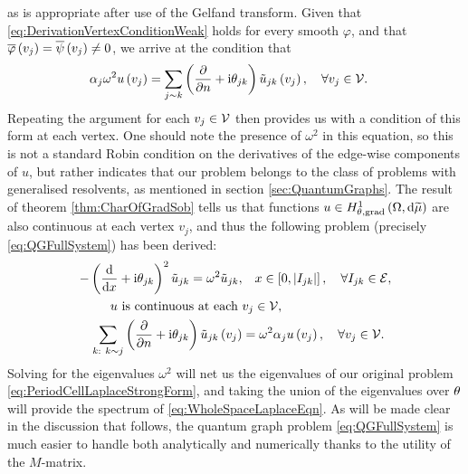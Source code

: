as is appropriate after use of the Gelfand transform.
Given that \eqref{eq:DerivationVertexConditionWeak} holds for every smooth $\varphi$, and that $\overline{\varphi}\left( v_j \right)=\overline{\psi}\left( v_j \right)\neq 0$, we arrive at the condition that
\begin{align*}
	\alpha_j\omega^2 u\left( v_j \right) &= \sum_{j\sim k}\left( \dfrac{\partial }{\partial n} + \mathrm{i}\theta_{jk} \right)\tilde{u}_{jk}\left( v_j \right), \quad \forall v_j \in \mathcal{V}.
\end{align*}
Repeating the argument for each $v_j\in \mathcal{V}$ then provides us with a condition of this form at each vertex.
One should note the presence of $\omega^2$ in this equation, so this is not a standard Robin condition on the derivatives of the edge-wise components of $u$, but rather indicates that our problem belongs to the class of problems with generalised resolvents, as mentioned in section \ref{sec:QuantumGraphs}.
The result of theorem \ref{thm:CharOfGradSob} tells us that functions $u\in H^1_{\theta, \mathrm{grad}}\left( \Omega, \mathrm{d}\widetilde{\mu} \right)$ are also continuous at each vertex $v_j$, and thus the following problem (precisely \eqref{eq:QGFullSystem}) has been derived:
\begin{align*}
	-\left( \dfrac{\mathrm{d}}{\mathrm{d}x} + \mathrm{i}\theta_{jk} \right)^2 \tilde{u}_{jk} = \omega^2 \tilde{u}_{jk}, &\quad x\in\left[ 0,\left\lvert I_{jk} \right\rvert \right], \quad \forall I_{jk}\in \mathcal{E}, \\
	u \text{ is continuous at each } &v_j \in \mathcal{V}, \\
	\sum_{k: \ k\sim j}\left( \dfrac{\partial }{\partial n} + \mathrm{i}\theta_{jk} \right)\tilde{u}_{jk}\left( v_j \right) &= \omega^2\alpha_{j}u\left( v_j \right),  \quad \forall v_j \in \mathcal{V}.
\end{align*}
Solving for the eigenvalues $\omega^2$ will net us the eigenvalues of our original problem \eqref{eq:PeriodCellLaplaceStrongForm}, and taking the union of the eigenvalues over $\theta$ will provide the spectrum of \eqref{eq:WholeSpaceLaplaceEqn}.
As will be made clear in the discussion that follows, the quantum graph problem \eqref{eq:QGFullSystem} is much easier to handle both analytically and numerically thanks to the utility of the $M$-matrix.